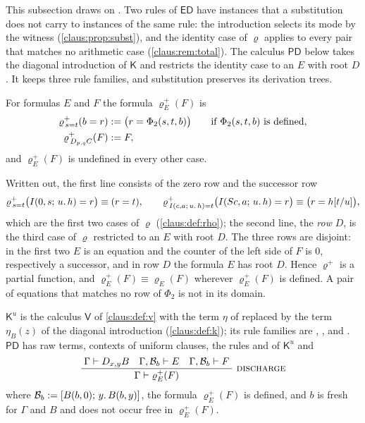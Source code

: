 This subsection draws on . Two rules of
$\mathsf{ED}$ have instances that a substitution does not carry to
instances of the same rule: the introduction selects its mode by the
witness (\cref{claus:prop:subst}), and the identity case of $\varrho$
applies to every pair that matches no arithmetic case
(\cref{claus:rem:total}). The calculus $\mathsf{PD}$ below takes the
diagonal introduction of $\mathsf{K}$ and restricts the identity case to an
$E$ with root $D$. It keeps three rule families, and substitution preserves
its derivation trees.

\begin{definition}
\label{claus:def:rhoplus}
For formulas $E$ and $F$ the formula $\varrho^{+}_E(F)$ is
\begin{align*}
 \varrho^{+}_{\,s=t}(b=r)&\mathrel{:=}\bigl(r=\Phi_2(s,t,b)\bigr)
   \qquad\text{if }\Phi_2(s,t,b)\text{ is defined},\\
 \varrho^{+}_{\,D_{p,q}C}(F)&\mathrel{:=} F,
\end{align*}
and $\varrho^{+}_E(F)$ is undefined in every other case.
\end{definition}

Written out, the first line consists of the zero row and the successor row
\[
 \varrho^{+}_{\,s=t}\bigl(I(0,s;\,u.\,h)=r\bigr)\equiv(r=t),\qquad
 \varrho^{+}_{\,I(c,a;\,u.\,h)=t}\bigl(I(S c,a;\,u.\,h)=r\bigr)
 \equiv\bigl(r=h[t/u]\bigr),
\]
which are the first two cases of $\varrho$ (\cref{claus:def:rho}); the
second line, the \emph{row} $D$, is the third case of $\varrho$ restricted
to an $E$ with root $D$. The three rows are disjoint: in the first two $E$
is an equation and the counter of the left side of $F$ is $0$,
respectively a successor, and in row $D$ the formula $E$ has root $D$.
Hence $\varrho^{+}$ is a partial function, and
$\varrho^{+}_E(F)\equiv\varrho_E(F)$ wherever $\varrho^{+}_E(F)$ is
defined. A pair of equations that matches no row of $\Phi_2$ is not in
its domain.

\begin{definition}
\label{claus:def:pd}
$\mathsf{K}^{u}$ is the calculus $\mathsf{V}$ of \cref{claus:def:v} with
the term $\eta$ of  replaced by the term $\eta_B(z)$ of the
diagonal introduction (\cref{claus:def:k}); its rule families are
, ,  and .
$\mathsf{PD}$ has raw terms, contexts of uniform clauses, the rules
 and  of $\mathsf{K}^{u}$ and
\[
 \infrule{\Gamma\proves\D{x}{y}B\quad
          \Gamma,\mathcal{B}_b\proves E\quad
          \Gamma,\mathcal{B}_b\proves F}
         {\Gamma\proves\varrho^{+}_E(F)}\ \rulename{Discharge}
\]
where $\mathcal{B}_b\mathrel{:=}[B(b,0);\,y.\,B(b,y)]$, the formula
$\varrho^{+}_E(F)$ is defined, and $b$ is fresh for $\Gamma$ and $B$ and
does not occur free in $\varrho^{+}_E(F)$.
\end{definition}

